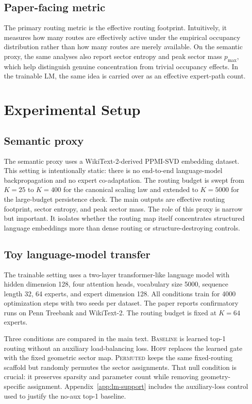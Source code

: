 \documentclass{article}
\begin{document}
\subsection{Paper-facing metric}
The primary routing metric is the effective routing footprint. Intuitively, it measures how many routes are effectively active under the empirical occupancy distribution rather than how many routes are merely available. On the semantic proxy, the same analyses also report sector entropy and peak sector mass $p_{\max}$, which help distinguish genuine concentration from trivial occupancy effects. In the trainable LM, the same idea is carried over as an effective expert-path count.

\section{Experimental Setup}
\subsection{Semantic proxy}
The semantic proxy uses a WikiText-2-derived PPMI-SVD embedding dataset. This setting is intentionally static: there is no end-to-end language-model backpropagation and no expert co-adaptation. The routing budget is swept from $K=25$ to $K=400$ for the canonical scaling law and extended to $K=5000$ for the large-budget persistence check. The main outputs are effective routing footprint, sector entropy, and peak sector mass. The role of this proxy is narrow but important. It isolates whether the routing map itself concentrates structured language embeddings more than dense routing or structure-destroying controls.

\subsection{Toy language-model transfer}
The trainable setting uses a two-layer transformer-like language model with hidden dimension 128, four attention heads, vocabulary size 5000, sequence length 32, 64 experts, and expert dimension 128. All conditions train for 4000 optimization steps with two seeds per dataset. The paper reports confirmatory runs on Penn Treebank and WikiText-2. The routing budget is fixed at $K=64$ experts.

Three conditions are compared in the main text. \textsc{Baseline} is learned top-1 routing without an auxiliary load-balancing loss. \textsc{Hopf} replaces the learned gate with the fixed geometric sector map. \textsc{Permuted} keeps the same fixed-routing scaffold but randomly permutes the sector assignments. That null condition is crucial: it preserves sparsity and parameter count while removing geometry-specific assignment. Appendix~\ref{app:lm-support} includes the auxiliary-loss control used to justify the no-aux top-1 baseline.
\end{document}
